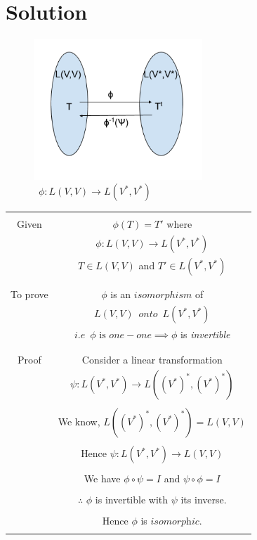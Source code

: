 \documentclass[journal,12pt,twocolumn]{IEEEtran}
\begin{document}
\section{Solution}
\begin{figure}[H]
\centering
\includegraphics[width=2.5in]{fig/transpose.png}
\caption{$\enspace \phi : L(V,V) \rightarrow L(V^*,V^*)$}
\end{figure}
\begin{table}[h]
\begin{center}
\begin{tabular}{|c|c|}
\hline
& \\
Given & $\phi(T) = T'$ where\\
& $\phi : L(V,V) \rightarrow L(V^*,V^*)$\\
& $T \in L(V,V)$ and $T' \in L(V^*,V^*)$\\
& \\
\hline
& \\
To prove & $\phi$ is an $isomorphism$ of\\
& $L(V,V) \enspace onto \enspace L(V^*,V^*)$\\
& $i.e \enspace \phi \text{ is } one-one \implies \phi$ is \textit{invertible}\\
& \\ 
\hline
& \\
Proof & Consider a linear transformation\\
& $\psi : L(V^*,V^*) \rightarrow L((V^*)^*,(V^*)^*)$\\
& \\
& We know, $L((V^*)^*,(V^*)^*) = L(V,V)$\\
& \\
& Hence $\psi : L(V^*,V^*) \rightarrow L(V,V)$\\
& \\
& We have $\phi \circ \psi = I$ and $\psi \circ \phi = I$\\
& \\
& $\therefore$ $\phi$ is invertible with $\psi$ its inverse.\\
& \\
& Hence $\phi$ is $\textit{isomorphic}$.\\
& \\
\hline
\end{tabular}
\end{center}
\end{table}
\end{document}
